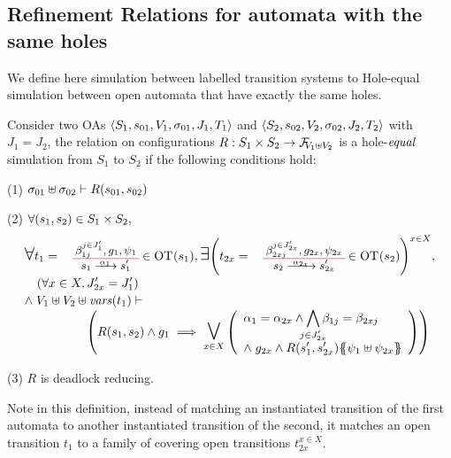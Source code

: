 \documentclass[runningheads]{llncs}
\newcommand{\symb}[1]{\makebox{\it #1}}
\begin{document}
\subsection{Refinement Relations for automata with the same holes}

We define here simulation between labelled transition systems to Hole-equal simulation  between  open automata that have exactly the same holes.
\begin{definition}
Consider two OAs \(\OAg[1]\) and \(\OAg[2]\) with  \(J_1 = J_2\), the relation on configurations \(R: S_1 \times S_2 \to \rformulas[V_1 \uplus V_2]\) is a hole-\(\symb{equal}\) simulation from $S_1$ to $S_2$ if the following conditions hold: 
\item[(1)] \(\sigma_{01} \uplus \sigma_{02} \vdash R\mpar{s_{01}, s_{02}}\)
\item[(2)] \(\forall \mpar{s_1, s_2} \in S_1 \times S_2,\)\vspace{-8pt}
\noindent\begin{multline*}
\everymath{\displaystyle}\begin{array}{l}
		\bigsymb{\forall} t_1 = \OTx{1}{}{1}{1} \in \fOT{s_1}, \bigsymb{\exists} \mpar{t_{2x} = \OTx{2}{x}{2x}{2x} \in \fOT{s_2}}^{x \in X}, \\[10pt]
		\quad \mpar{\forall x \in X, J'_{2x}= J'_1} \\[2pt]
		\nwedge V_1 \uplus V_2 \uplus \fvars{t_1} \vdash\\
\hspace{5em} \left( R\mpar{s_1, s_2} \wedge g_1 \implies \operatorname*{\bigsymb{\bigvee}}_{x \in X} \mpar{\begin{array}{l}
			\alpha_1 = \alpha_{2x} \wedge \bigwedge_\subbox{j \in J'_{2x}} \beta_{1j} = \beta_{2xj} \\[12pt]
			\nwedge g_{2x} \wedge R\mpar{s'_1, s'_{2x}}\psubst{\psi_1 \uplus \psi_{2x}}
		\end{array}}\right)
	\end{array} 
\end{multline*}
\item[(3)] $R$ is deadlock reducing.
\end{definition}


Note in this definition, instead of matching an instantiated transition of the first automata to another instantiated transition of the second, it matches an open transition $t_1$ to a family of covering open transitions $t_{2x}^{x\in X}$. %
\end{document}
